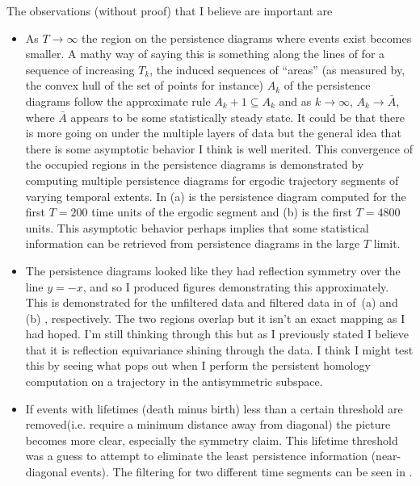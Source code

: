 \begin{description}
{\begin{description}
The observations (without proof) that I believe are important are
\begin{itemize}
\item
    As $T \rightarrow \infty$ the region on the persistence diagrams where events
    exist becomes smaller. A mathy way of saying this is something along the
    lines of for a sequence of increasing $T_k$, the induced sequences of
    ``areas'' (as measured by, the convex hull of the set of points for instance)
    $A_k$ of the persistence diagrams follow the approximate rule $A_k+1
    \subseteq A_k$ and as $k \rightarrow \infty$, $A_k \rightarrow \bar{A}$,
    where $\bar{A}$ appears to be some statistically steady state. It could be
    that there is more going on under the multiple layers of data but the general
    idea that there is some asymptotic behavior I think is well merited. This
    convergence of the occupied regions in the persistence diagrams is
    demonstrated by computing multiple persistence diagrams for ergodic
    trajectory segments of varying temporal extents. In  (a)
    is the persistence diagram computed for the first $T=200$ time units of the
    ergodic segment and (b) is the first $T=4800$ units. This asymptotic behavior
    perhaps implies that some statistical information can be retrieved from
    persistence diagrams in the large $T$ limit.
\item
    The persistence diagrams looked like they had reflection symmetry over the
    line $y=-x$, and so I produced figures demonstrating this approximately. This
    is demonstrated for the unfiltered data and filtered data in of
    \,(a) and (b) , respectively. The two regions overlap
    but it isn't an exact mapping as I had hoped. I'm still thinking through this
    but as I previously stated I believe that it is reflection equivariance
    shining through the data. I think I might test this by seeing what pops out
    when I perform the persistent homology computation on a trajectory in the
    antisymmetric subspace.
\item
    If events with lifetimes (death minus birth) less than a certain threshold
    are removed(i.e. require a minimum distance away from diagonal) the picture
    becomes more clear, especially the symmetry claim. This lifetime threshold
    was a guess to attempt to eliminate the least persistence information
    (near-diagonal eve\-nts). The filtering for two different time segments can
    be seen in .
\end{itemize}


\end{description}}
\end{description}

